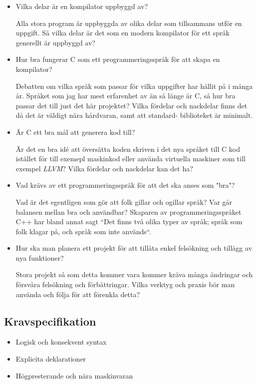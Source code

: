 \documentclass{theme}
\begin{document}
\begin{itemize}
	\item Vilka delar är en kompilator uppbyggd av?
		
		Alla stora program är uppbyggda av olika delar som tillsammans utför en 
		uppgift. Så vilka delar är det som en modern kompilator för ett språk
		generellt är uppbyggd av?

	\item Hur bra fungerar C som ett programmeringsspråk för att skapa en 
		kompilator?

		Debatten om vilka språk som passar för vilka uppgifter har hållit på i 
		många år. Språket som jag har mest erfarenhet av än så länge är C, så
		hur bra passar det till just det här projektet? Vilka fördelar och 
		nackdelar finns det då det är väldigt nära hårdvaran, samt att standard-
		biblioteket är minimalt.

	\item Är C ett bra mål att generera kod till?

		Är det en bra idé att översätta koden skriven i det nya språket till C
		kod istället för till exemepl maskinkod eller använda virtuella maskiner
		som till exempel \textit{LLVM}? Vilka fördelar och nackdelar kan det ha?

	\item Vad krävs av ett programmeringsspråk för att det ska anses som "bra"?

		Vad är det egentligen som gör att folk gillar och ogillar språk? Var 
		går balansen mellan bra och användbar? Skaparen av programmeringsspråket
		C++ har bland annat sagt ``Det finns två olika typer av språk; språk som
		folk klagar på, och språk som inte används``. 

	\item Hur ska man planera ett projekt för att tillåta enkel felsökning och 
		tillägg av nya funktioner?

		Stora projekt så som detta kommer vara kommer kräva många ändringar och
		försvåra felsökning och förbättringar. Vilka verktyg och praxis bör man
		använda och följa för att förenkla detta?

\end{itemize}

\subsection{Kravspecifikation}

\begin{itemize}
	\item Logisk och konsekvent syntax
	\item Explicita deklarationer
	\item Högpresterande och nära maskinvaran
\end{itemize}
\end{document}
